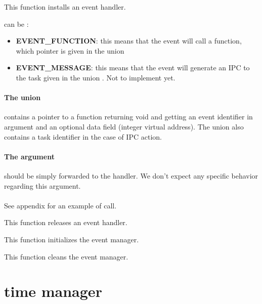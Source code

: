 	 {
	   This function installs an event handler.

	    can be :
	   \begin{itemize}
	     \item
	       \textbf{EVENT\_FUNCTION}: this means that the event will
	       call a function, which pointer is given in the union
	     \item
	       \textbf{EVENT\_MESSAGE}: this means that the event will
	       generate an IPC to the task given in the union
	       . \textup{Not to implement yet}.
	   \end{itemize}

	   \paragraph{The union } contains a pointer to a
	   function returning void and getting an event identifier in
	   argument and an optional data field (integer virtual address).
           The union also contains a task identifier in the case of IPC action.


           \paragraph{The  argument} should be simply forwarded to the
           handler. We don't expect any specific behavior regarding this argument.

           \paragraph{} See appendix for an example of call.
	 }

	 {
	   This function releases an event handler.
	 }

	 {
	   This function initializes the event manager.
	 }

	 {
	   This function cleans the event manager.
	 }


%
%

\newpage

\section{time manager}
